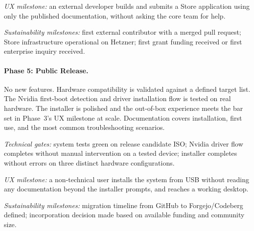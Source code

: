 \emph{UX milestone:} an external developer builds and submits a Store
application using only the published documentation, without asking the core
team for help.

\emph{Sustainability milestones:} first external contributor with a merged
pull request; Store infrastructure operational on Hetzner; first grant
funding received or first enterprise inquiry received.

\paragraph{Phase 5: Public Release.}
No new features. Hardware compatibility is validated against a defined target
list. The Nvidia first-boot detection and driver installation flow is tested on
real hardware. The installer is polished and the out-of-box experience meets
the bar set in Phase~3's UX milestone at scale. Documentation covers
installation, first use, and the most common troubleshooting scenarios.

\emph{Technical gates:} system tests green on release candidate ISO; Nvidia
driver flow completes without manual intervention on a tested device; installer
completes without errors on three distinct hardware configurations.

\emph{UX milestone:} a non-technical user installs the system from USB without
reading any documentation beyond the installer prompts, and reaches a working
desktop.

\emph{Sustainability milestones:} migration timeline from GitHub to
Forgejo/Codeberg defined; incorporation decision made based on available
funding and community size.
